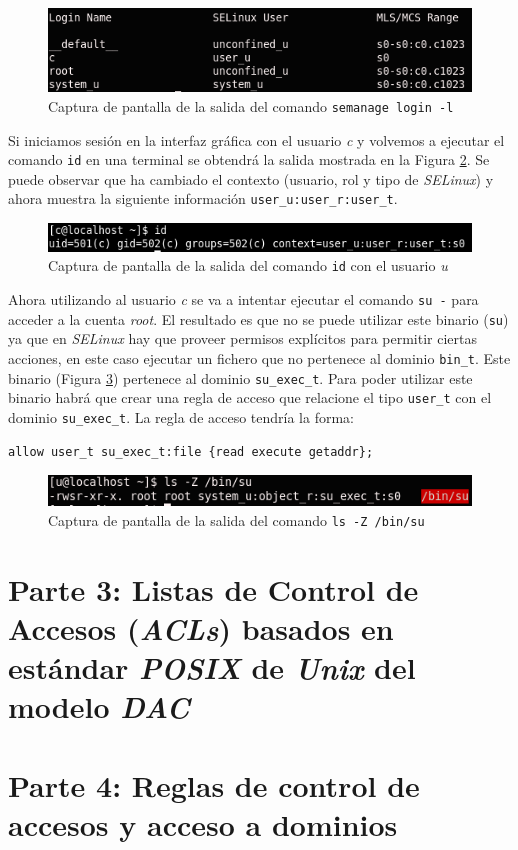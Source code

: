 \documentclass[10pt,a4paper]{article}
\begin{document}
\begin{figure}[h!]
\centering
\includegraphics[scale=0.5]{images/parte2_8.png}
\caption{Captura de pantalla de la salida del comando \texttt{semanage login -l}}
\label{fig:parte2_8}
\end{figure}

Si iniciamos sesión en la interfaz gráfica con el usuario \emph{c} y volvemos a ejecutar el comando \texttt{id} en una terminal se obtendrá la salida mostrada en la Figura \ref{fig:parte2_10}. Se puede observar que ha cambiado el contexto (usuario, rol y tipo de \emph{SELinux}) y ahora muestra la siguiente información \texttt{user\_{}u:user\_{}r:user\_{}t}.\\

\begin{figure}[h!]
\centering
\includegraphics[scale=0.7]{images/parte2_10.png}
\caption{Captura de pantalla de la salida del comando \texttt{id} con el usuario \emph{u}}
\label{fig:parte2_10}
\end{figure}

Ahora utilizando al usuario \emph{c} se va a intentar ejecutar el comando \texttt{su -} para acceder a la cuenta \emph{root}. El resultado es que no se puede utilizar este binario (\texttt{su}) ya que en \emph{SELinux} hay que proveer permisos explícitos para permitir ciertas acciones, en este caso ejecutar un fichero que no pertenece al dominio \texttt{bin\_{}t}. Este binario (Figura \ref{fig:parte2_11}) pertenece al dominio \texttt{su\_{}exec\_{}t}. Para poder utilizar este binario habrá que crear una regla de acceso que relacione el tipo \texttt{user\_{}t} con el dominio \texttt{su\_{}exec\_{}t}. La regla de acceso tendría la forma:

\begin{lstlisting}
allow user_t su_exec_t:file {read execute getaddr};
\end{lstlisting}

\begin{figure}[h!]
\centering
\includegraphics[scale=0.7]{images/parte2_11.png}
\caption{Captura de pantalla de la salida del comando \texttt{ls -Z /bin/su}}
\label{fig:parte2_11}
\end{figure}

\section{Parte 3: Listas de Control de Accesos (\emph{ACLs}) basados en estándar \emph{POSIX} de \emph{Unix} del modelo \emph{DAC}}



\section{Parte 4: Reglas de control de accesos y acceso a dominios}
\end{document}
